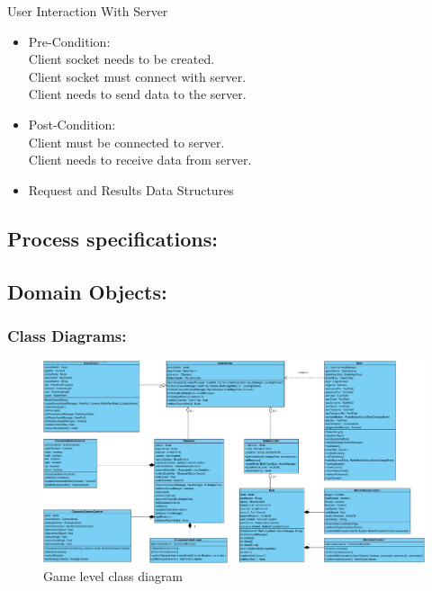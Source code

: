 \documentclass[letterpaper]{article}
\begin{document}
					\vspace{0.1in}
					User Interaction With Server
					\begin{itemize}
						\item Pre-Condition: \\
							Client socket needs to be created. \\
							Client socket must connect with server. \\
							Client needs to send data to the server. 
						\item Post-Condition: \\
							Client must be connected to server. \\
							Client needs to receive data from server.			
						\item Request and Results Data Structures \\
						
					\end{itemize}
					
			\vspace{0.2in}
			\subsection*{Process specifications:}
			\vspace{0.1in}
			
			
			
			\vspace{0.2in}
			\subsection*{Domain Objects:}
			\vspace{0.1in}
			
				\vspace{0.2in}
				\subsubsection*{Class Diagrams:}
				\vspace{0.1in}
				
					\begin{figure}[H]
					\centering
					\includegraphics[width=180mm]{UML_Diagram/Class/Game_Classes.jpg}
					\caption{Game level class diagram}
					\label{overflow}
					\end{figure}
					
\end{document}
